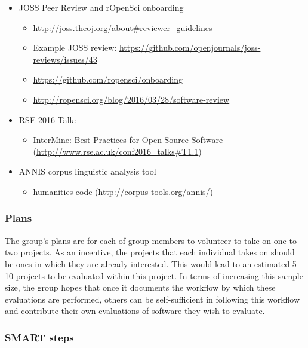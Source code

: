 \begin{itemize}
\item JOSS Peer Review and rOpenSci onboarding
\begin{itemize} 
\item \url{http://joss.theoj.org/about#reviewer_guidelines} 
\item Example JOSS review: \url{https://github.com/openjournals/joss-reviews/issues/43}
\item \url{https://github.com/ropensci/onboarding}
\item \url{http://ropensci.org/blog/2016/03/28/software-review}
\end{itemize}

\item RSE 2016 Talk:
\begin{itemize}
\item InterMine: Best Practices for Open Source Software (\url{http://www.rse.ac.uk/conf2016_talks#T1.1})
\end{itemize}

\item ANNIS corpus linguistic analysis tool
\begin{itemize}
\item humanities code (\url{http://corpus-tools.org/annis/})
\end{itemize}

\end{itemize}


\subsubsection{Plans}

The group's plans are for each of group members to volunteer to take on one to two projects. As an incentive, the projects that each individual takes on should be ones in which they are already interested.  This would lead to an estimated 5--10 projects to be evaluated within this project.  In terms of increasing this sample size, the group hopes that once it documents the workflow by which these evaluations are performed, others can be self-sufficient in following this workflow and contribute their own evaluations of software they wish to evaluate.

\subsubsection{SMART steps}


